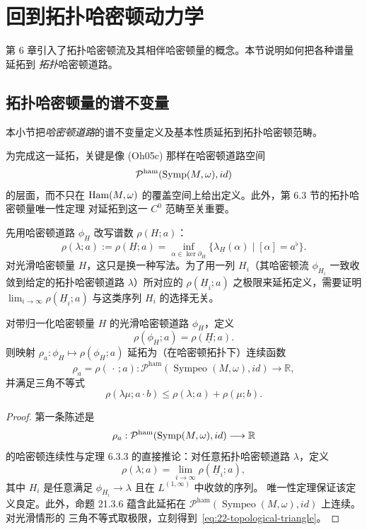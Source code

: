 \section{回到拓扑哈密顿动力学}

第 6 章引入了拓扑哈密顿流及其相伴哈密顿量的概念。本节说明如何把各种谱量延拓到
\emph{拓扑}哈密顿道路。

\subsection{拓扑哈密顿量的谱不变量}

本小节把\emph{哈密顿道路}的谱不变量定义及基本性质延拓到拓扑哈密顿范畴。

为完成这一延拓，关键是像 (Oh05c) 那样在哈密顿道路空间
\[
 \mathcal P^{\mathrm{ham}}(\operatorname{Symp}(M,\omega),id)
\]
的层面，而不只在
$\operatorname{Ham}(M,\omega)$ 的覆盖空间上给出定义。此外，第 6.3 节的拓扑哈密顿量唯一性定理
对延拓到这一 $C^0$ 范畴至关重要。

先用哈密顿道路 $\phi_H$ 改写谱数 $\rho(H;a)$：
\[
 \rho(\lambda;a):=\rho(\underline H;a)
 =\inf_{\alpha\in\ker\partial_H}\{\lambda_{\underline H}(\alpha)\mid[\alpha]=a^\flat\}.
\]
对光滑哈密顿量 $H$，这只是换一种写法。为了用一列 $H_i$（其哈密顿流
$\phi_{H_i}$ 一致收敛到给定的拓扑哈密顿道路 $\lambda$）所对应的
$\rho(\underline H_i;a)$ 之极限来延拓定义，需要证明
$\lim_{i\to\infty}\rho(\underline H_i;a)$ 与这类序列 $H_i$ 的选择无关。

\begin{theorem}
\label{thm:22-topological-spectral-invariant}
对带归一化哈密顿量 $H$ 的光滑哈密顿道路 $\phi_H$，定义
\[
 \rho(\phi_H;a)=\rho(\underline H;a).
\]
则映射 $\rho_a:\phi_H\mapsto\rho(\phi_H;a)$ 延拓为（在哈密顿拓扑下）连续函数
\[
 \rho_a=\rho(\,\cdot\,;a):
 \mathcal P^{\mathrm{ham}}(\operatorname{Sympeo}(M,\omega),id)
 \longrightarrow\mathbb R,
\]
并满足三角不等式
\begin{equation}
 \rho(\lambda\mu;a\cdot b)\leq\rho(\lambda;a)+\rho(\mu;b).
 \label{eq:22-topological-triangle}
\end{equation}
\end{theorem}

\begin{proof}
第一条陈述是
\[
 \rho_a:\mathcal P^{\mathrm{ham}}(\operatorname{Symp}(M,\omega),id)\longrightarrow\mathbb R
\]
的哈密顿连续性与定理 6.3.3 的直接推论：对任意拓扑哈密顿道路 $\lambda$，定义
\begin{equation}
 \rho(\lambda;a)=\lim_{i\to\infty}\rho(\underline H_i;a),
 \label{eq:22-topological-spectral-limit}
\end{equation}
其中 $H_i$ 是任意满足 $\phi_{H_i}\to\lambda$ 且在 $L^{(1,\infty)}$ 中收敛的序列。
唯一性定理保证该定义良定。此外，命题 21.3.6 蕴含此延拓在
$\mathcal P^{\mathrm{ham}}(\operatorname{Sympeo}(M,\omega),id)$ 上连续。对光滑情形的
三角不等式取极限，立刻得到~\eqref{eq:22-topological-triangle}。
\end{proof}

